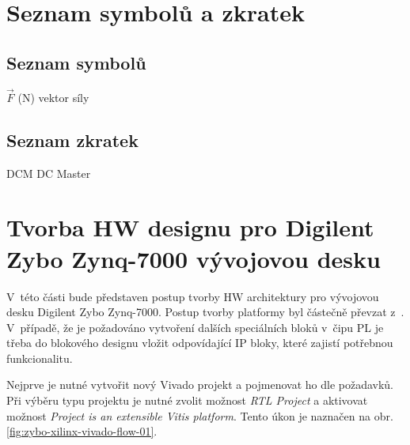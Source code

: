 \documentclass[a4paper, twoside, 11pt]{article}
\begin{document}
\flushbottom %


\newpage
\setmonofont{Times New Roman}
\printbibliography[title={{Literatura}}]	
\nocite{*}
\setmonofont{Courier}
	\appendix
	\begin{appendices}
	\section{Seznam symbolů a zkratek}
		\subsection{Seznam symbolů}
			\begin{description}
			\item $\vec{F}$ (N) \hspace*{\parindent} vektor síly
		\end{description}
	\subsection{Seznam zkratek}
		\begin{description}
			\item DCM \hspace*{\parindent} DC Master
		\end{description}

		\section{Tvorba HW designu pro Digilent Zybo Zynq-7000 vývojovou desku}\label{sec:appendicies:-tvorba-hw-designu-pro-digilent-zybo-zynq-7000-vyvojovou-desku}
		V~této části bude představen postup tvorby HW architektury pro vývojovou desku Digilent Zybo Zynq-7000. Postup tvorby platformy byl částečně převzat z~\cite{hackster-vitis-2021-1-embedded-platform-for-zybo-z7-20}. V~případě, že je požadováno vytvoření dalších speciálních bloků v~čipu PL je třeba do blokového designu vložit odpovídající IP bloky, které zajistí potřebnou funkcionalitu.\par
		Nejprve je nutné vytvořit nový Vivado projekt a pojmenovat ho dle požadavků. Při výběru typu projektu je nutné zvolit možnost \textit{RTL Project} a aktivovat možnost \textit{Project is an extensible Vitis platform}. Tento úkon je naznačen na obr. \ref{fig:zybo-xilinx-vivado-flow-01}.


\end{appendices}
\end{document}
